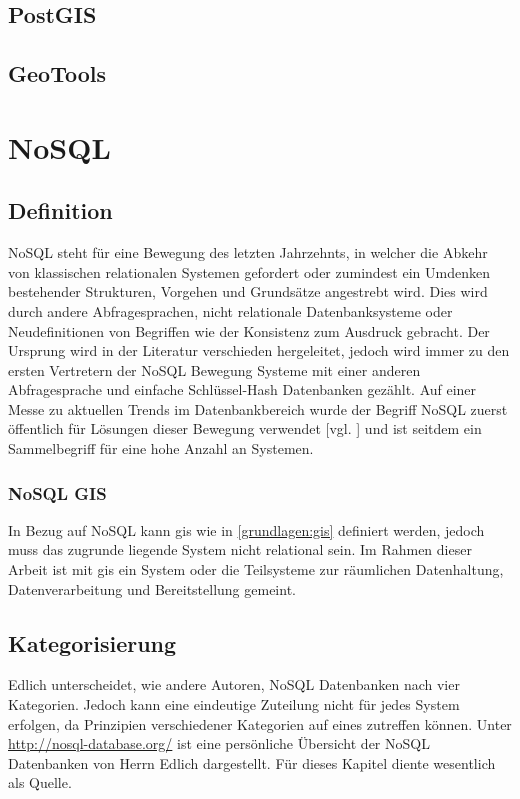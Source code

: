 \subsection{PostGIS}

\subsection{GeoTools}



\section{NoSQL}

\subsection{Definition}

NoSQL steht für eine Bewegung des letzten Jahrzehnts, in welcher die Abkehr von klassischen relationalen Systemen gefordert oder zumindest ein Umdenken bestehender Strukturen, Vorgehen und Grundsätze angestrebt wird.
Dies wird durch andere Abfragesprachen, nicht relationale Datenbanksysteme oder Neudefinitionen von Begriffen wie der Konsistenz zum Ausdruck gebracht.
Der Ursprung wird in der Literatur verschieden hergeleitet, jedoch wird immer zu den ersten Vertretern der NoSQL Bewegung Systeme mit einer anderen Abfragesprache und einfache Schlüssel-Hash Datenbanken gezählt.
Auf einer Messe zu aktuellen Trends im Datenbankbereich wurde der Begriff NoSQL zuerst öffentlich für Lösungen dieser Bewegung verwendet [vgl. \cite{website:originnosql}] und ist seitdem ein Sammelbegriff für eine hohe Anzahl an Systemen.

\subsubsection{NoSQL GIS}

In Bezug auf NoSQL kann \Gls{gis} wie in \ref{grundlagen:gis} definiert werden, jedoch muss das zugrunde liegende System nicht relational sein.
Im Rahmen dieser Arbeit ist mit \Gls{gis} ein System oder die Teilsysteme zur räumlichen Datenhaltung, Datenverarbeitung und Bereitstellung gemeint.

\subsection{Kategorisierung}
Edlich unterscheidet, wie andere Autoren, NoSQL Datenbanken nach vier Kategorien.
Jedoch kann eine eindeutige Zuteilung nicht für jedes System erfolgen, da Prinzipien verschiedener Kategorien auf eines zutreffen können.
Unter \url{http://nosql-database.org/} ist eine persönliche Übersicht der NoSQL Datenbanken von Herrn Edlich dargestellt.
Für dieses Kapitel diente wesentlich \cite{beamer:nosql} als Quelle.


